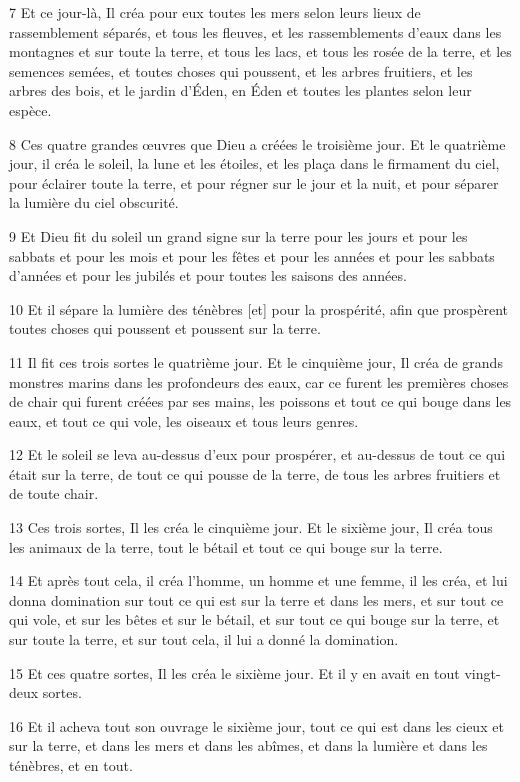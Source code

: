 \par 7 Et ce jour-là, Il créa pour eux toutes les mers selon leurs lieux de rassemblement séparés, et tous les fleuves, et les rassemblements d'eaux dans les montagnes et sur toute la terre, et tous les lacs, et tous les rosée de la terre, et les semences semées, et toutes choses qui poussent, et les arbres fruitiers, et les arbres des bois, et le jardin d'Éden, en Éden et toutes les plantes selon leur espèce.
\par 8 Ces quatre grandes œuvres que Dieu a créées le troisième jour. Et le quatrième jour, il créa le soleil, la lune et les étoiles, et les plaça dans le firmament du ciel, pour éclairer toute la terre, et pour régner sur le jour et la nuit, et pour séparer la lumière du ciel obscurité.
\par 9 Et Dieu fit du soleil un grand signe sur la terre pour les jours et pour les sabbats et pour les mois et pour les fêtes et pour les années et pour les sabbats d'années et pour les jubilés et pour toutes les saisons des années.
\par 10 Et il sépare la lumière des ténèbres [et] pour la prospérité, afin que prospèrent toutes choses qui poussent et poussent sur la terre.
\par 11 Il fit ces trois sortes le quatrième jour. Et le cinquième jour, Il créa de grands monstres marins dans les profondeurs des eaux, car ce furent les premières choses de chair qui furent créées par ses mains, les poissons et tout ce qui bouge dans les eaux, et tout ce qui vole, les oiseaux et tous leurs genres.
\par 12 Et le soleil se leva au-dessus d'eux pour prospérer, et au-dessus de tout ce qui était sur la terre, de tout ce qui pousse de la terre, de tous les arbres fruitiers et de toute chair.
\par 13 Ces trois sortes, Il les créa le cinquième jour. Et le sixième jour, Il créa tous les animaux de la terre, tout le bétail et tout ce qui bouge sur la terre.
\par 14 Et après tout cela, il créa l'homme, un homme et une femme, il les créa, et lui donna domination sur tout ce qui est sur la terre et dans les mers, et sur tout ce qui vole, et sur les bêtes et sur le bétail, et sur tout ce qui bouge sur la terre, et sur toute la terre, et sur tout cela, il lui a donné la domination.
\par 15 Et ces quatre sortes, Il les créa le sixième jour. Et il y en avait en tout vingt-deux sortes.
\par 16 Et il acheva tout son ouvrage le sixième jour, tout ce qui est dans les cieux et sur la terre, et dans les mers et dans les abîmes, et dans la lumière et dans les ténèbres, et en tout.
